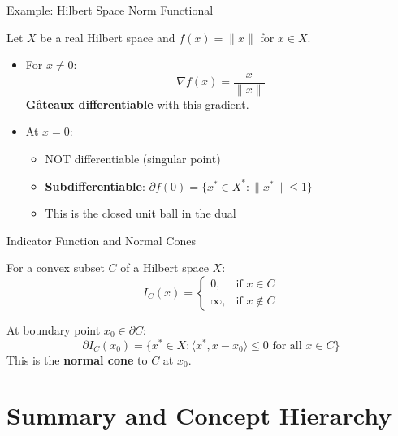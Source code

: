 \documentclass[aspectratio=169,10pt]{beamer}
\begin{document}
\begin{frame}{Example: Hilbert Space Norm Functional}
  \begin{example}[Example 3.21]
    Let $X$ be a real Hilbert space and $f(x) = \|x\|$ for $x \in X$.
    \begin{itemize}
      \item For $x \neq 0$:
        \[
          \nabla f(x) = \frac{x}{\|x\|}
        \]
        \textbf{Gâteaux differentiable} with this gradient.

      \item At $x = 0$:
        \begin{itemize}
          \item NOT differentiable (singular point)
          \item \textbf{Subdifferentiable}: $\partial f(0) = \{x^* \in X^*: \|x^*\| \leq 1\}$
          \item This is the closed unit ball in the dual
        \end{itemize}
    \end{itemize}
  \end{example}
\end{frame}

\begin{frame}{Indicator Function and Normal Cones}
  \begin{example}
    For a convex subset $C$ of a Hilbert space $X$:
    \[
      I_C(x) = \begin{cases}
        0, & \text{if } x \in C \\
        \infty, & \text{if } x \notin C
      \end{cases}
    \]

    At boundary point $x_0 \in \partial C$:
    \[
      \partial I_C(x_0) = \{x^* \in X: \langle x^*, x - x_0 \rangle \leq 0 \text{ for all } x \in C\}
    \]
    This is the \textbf{normal cone} to $C$ at $x_0$.
  \end{example}
\end{frame}


\section{Summary and Concept Hierarchy}
\end{document}
